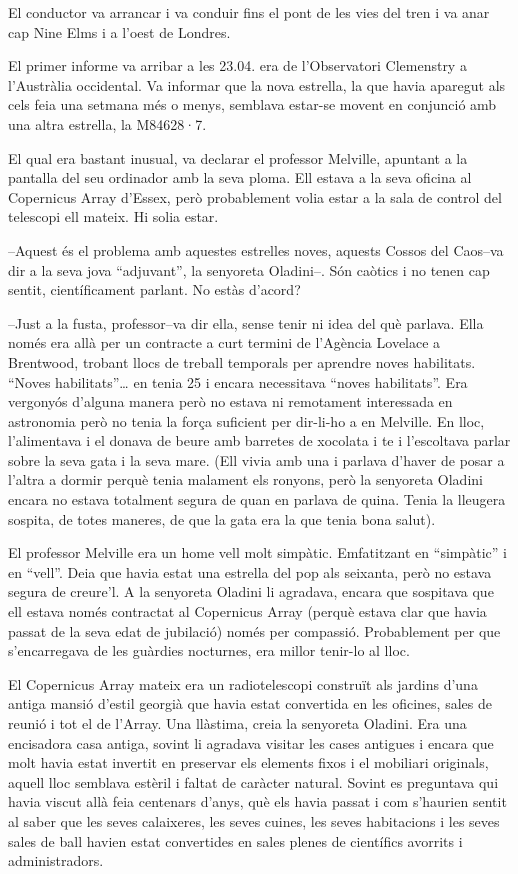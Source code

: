 El conductor va arrancar i va conduir fins el pont de les vies del tren
i va anar cap Nine Elms i a l'oest de Londres.

El primer informe va arribar a les 23.04. era de l'Observatori
Clemenstry a l'Austràlia occidental. Va informar que la nova estrella,
la que havia aparegut als cels feia una setmana més o menys, semblava
estar-se movent en conjunció amb una altra estrella, la M84628·7.

El qual era bastant inusual, va declarar el professor Melville, apuntant
a la pantalla del seu ordinador amb la seva ploma. Ell estava a la seva
oficina al Copernicus Array d'Essex, però probablement volia estar a la
sala de control del telescopi ell mateix. Hi solia estar.

--Aquest és el problema amb aquestes estrelles noves, aquests Cossos del
Caos--va dir a la seva jova ``adjuvant'', la senyoreta Oladini--. Són
caòtics i no tenen cap sentit, científicament parlant. No estàs d'acord?

--Just a la fusta, professor--va dir ella, sense tenir ni idea del què
parlava. Ella només era allà per un contracte a curt termini de
l'Agència Lovelace a Brentwood, trobant llocs de treball temporals per
aprendre noves habilitats. ``Noves habilitats''\ldots{} en tenia 25 i
encara necessitava ``noves habilitats''. Era vergonyós d'alguna manera
però no estava ni remotament interessada en astronomia però no tenia la
força suficient per dir-li-ho a en Melville. En lloc, l'alimentava i el
donava de beure amb barretes de xocolata i te i l'escoltava parlar sobre
la seva gata i la seva mare. (Ell vivia amb una i parlava d'haver de
posar a l'altra a dormir perquè tenia malament els ronyons, però la
senyoreta Oladini encara no estava totalment segura de quan en parlava
de quina. Tenia la lleugera sospita, de totes maneres, de que la gata
era la que tenia bona salut).

El professor Melville era un home vell molt simpàtic. Emfatitzant en
``simpàtic'' i en ``vell''. Deia que havia estat una estrella del pop
als seixanta, però no estava segura de creure'l. A la senyoreta Oladini
li agradava, encara que sospitava que ell estava només contractat al
Copernicus Array (perquè estava clar que havia passat de la seva edat de
jubilació) només per compassió. Probablement per que s'encarregava de
les guàrdies nocturnes, era millor tenir-lo al lloc.

El Copernicus Array mateix era un radiotelescopi construït als jardins
d'una antiga mansió d'estil georgià que havia estat convertida en les
oficines, sales de reunió i tot el de l'Array. Una llàstima, creia la
senyoreta Oladini. Era una encisadora casa antiga, sovint li agradava
visitar les cases antigues i encara que molt havia estat invertit en
preservar els elements fixos i el mobiliari originals, aquell lloc
semblava estèril i faltat de caràcter natural. Sovint es preguntava qui
havia viscut allà feia centenars d'anys, què els havia passat i com
s'haurien sentit al saber que les seves calaixeres, les seves cuines,
les seves habitacions i les seves sales de ball havien estat convertides
en sales plenes de científics avorrits i administradors.

